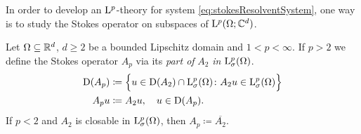 In order to develop an $\mathrm{L}^p$-theory for system \eqref{eq:stokesResolventSystem}, one way is to study the Stokes operator on subspaces of $\mathrm{L}^p(\Omega; \mathbb{C}^d)$. 

\begin{defn}
  Let $\Omega \subseteq \mathbb{R}^d$, $d \geq 2$ be a bounded Lipschitz domain and $1 < p < \infty$.
  If $p > 2$ we define the Stokes operator $A_p$ via its \emph{part of } $A_2$ \emph{in } $\mathrm{L}^p_\sigma(\Omega)$.
  \begin{align*}
    \mathrm{D}(A_p) &\coloneqq \Big\{ u \in \mathrm{D}(A_2) \cap \mathrm{L}^p_\sigma(\Omega) \colon A_2 u \in \mathrm{L}^p_\sigma(\Omega) \Big\} \\
    A_p u &\coloneqq A_2 u, \quad u \in \mathrm{D}(A_p).
  \end{align*}
  If $p < 2$ and $A_2$ is closable in $\mathrm{L}^p_\sigma(\Omega)$, then $A_p \coloneqq \overline{A_2}$.
\end{defn}

